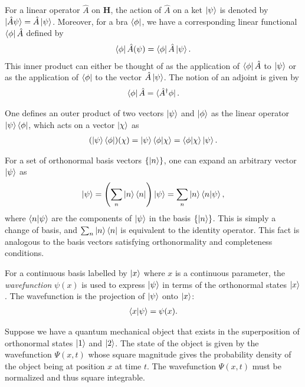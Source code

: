 For a linear operator $\hat{A}$ on $\mathbf{H}$, the action of $\hat{A}$ on a ket $\ket{\psi}$ is denoted by $\ket{\hat{A}\psi} = \hat{A}\ket{\psi}$. Moreover, for a bra $\bra{\phi}$, we have a corresponding linear functional $\bra{\phi}\hat{A}$ defined by
\begin{align*}
    \bra{\phi}\hat{A}(\psi) = \bra{\phi}\hat{A}\ket{\psi}.
\end{align*}
This inner product can either be thought of as the application of $\bra{\phi}\hat{A}$ to $\ket{\psi}$ or as the application of $\bra{\phi}$ to the vector $\hat{A}\ket{\psi}$. The notion of an adjoint is given by
\begin{align*}
    \bra{\phi}\hat{A} = \bra{\hat{A}^\dagger\phi}.
\end{align*}

One defines an outer product of two vectors $\ket{\psi}$ and $\ket{\phi}$ as the linear operator $\ket{\psi}\bra{\phi}$, which acts on a vector $\ket{\chi}$ as
\begin{align*}
    (\ket{\psi}\bra{\phi})(\chi) = \ket{\psi}\braket{\phi|\chi} = \braket{\phi|\chi}\ket{\psi}.
\end{align*}

For a set of orthonormal basis vectors $\{\ket{n}\}$, one can expand an arbitrary vector $\ket{\psi}$ as
\begin{align*}
    \ket{\psi} = \left( \sum_n \ket{n}\bra{n} \right)\ket{\psi} = \sum_n \ket{n}\braket{n|\psi},
\end{align*}
where $\braket{n|\psi}$ are the components of $\ket{\psi}$ in the basis $\{\ket{n}\}$. This is simply a change of basis, and $\sum_n \ket{n}\bra{n}$ is equivalent to the identity operator. This fact is analogous to the basis vectors satisfying orthonormality and completeness conditions.

For a continuous basis labelled by $\ket{x}$ where $x$ is a continuous parameter, the \textit{wavefunction} $\psi(x)$ is used to express $\ket{\psi}$ in terms of the orthonormal states $\ket{x}$. The wavefunction is the projection of $\ket{\psi}$ onto $\ket{x}$:
\begin{align*}
    \braket{x|\psi} = \psi(x).
\end{align*}

Suppose we have a quantum mechanical object that exists in the superposition of orthonormal states $\ket{1}$ and $\ket{2}$. The state of the object is given by the wavefunction $\Psi(x,t)$ whose square magnitude gives the probability density of the object being at position $x$ at time $t$. The wavefunction $\Psi(x,t)$ must be normalized and thus square integrable.

